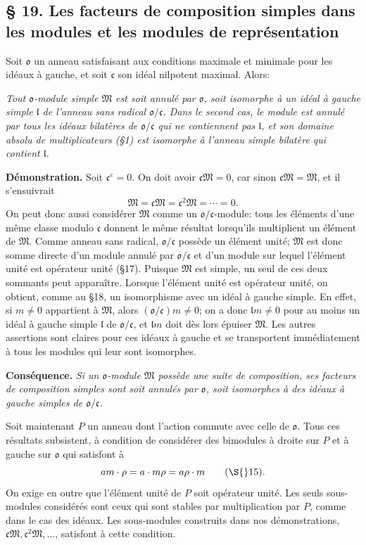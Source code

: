 
\providecommand{\mo}{\mathfrak{o}}
\providecommand{\mc}{\mathfrak{c}}
\providecommand{\mM}{\mathfrak{M}}
\providecommand{\ml}{\mathfrak{l}}

\subsection*{\S{} 19. Les facteurs de composition simples dans les modules et les modules de représentation}
Soit $\mo$ un anneau satisfaisant aux conditions maximale et minimale pour les idéaux à gauche, et soit $\mc$ son idéal nilpotent maximal. Alors:

\emph{Tout $\mo$-module simple $\mM$ est soit annulé par $\mo$, soit isomorphe à un idéal à gauche simple $\ml$ de l'anneau sans radical $\mo/\mc$. Dans le second cas, le module est annulé par tous les idéaux bilatères de $\mo/\mc$ qui ne contiennent pas $\ml$, et son domaine absolu de multiplicateurs (\S{}1) est isomorphe à l'anneau simple bilatère qui contient $\ml$.}

\textbf{Démonstration.} Soit $\mc^e=0$. On doit avoir $\mc\mM=0$, car sinon $\mc\mM=\mM$, et il s'ensuivrait
\[
        \mM=\mc\mM=\mc^2\mM=\cdots=0.
\]
On peut donc aussi considérer $\mM$ comme un $\mo/\mc$-module: tous les éléments d'une même classe modulo $\mc$ donnent le même résultat lorsqu'ils multiplient un élément de $\mM$. Comme anneau sans radical, $\mo/\mc$ possède un élément unité; $\mM$ est donc somme directe d'un module annulé par $\mo/\mc$ et d'un module sur lequel l'élément unité est opérateur unité (\S{}17). Puisque $\mM$ est simple, un seul de ces deux sommants peut apparaître. Lorsque l'élément unité est opérateur unité, on obtient, comme au \S{}18, un isomorphisme avec un idéal à gauche simple. En effet, si $m\ne0$ appartient à $\mM$, alors $(\mo/\mc)m\ne0$; on a donc $\ml m\ne0$ pour au moins un idéal à gauche simple $\ml$ de $\mo/\mc$, et $\ml m$ doit dès lors épuiser $\mM$. Les autres assertions sont claires pour ces idéaux à gauche et se transportent immédiatement à tous les modules qui leur sont isomorphes.

\textbf{Conséquence.} \emph{Si un $\mo$-module $\mM$ possède une suite de composition, ses facteurs de composition simples sont soit annulés par $\mo$, soit isomorphes à des idéaux à gauche simples de $\mo/\mc$.}

Soit maintenant $P$ un anneau dont l'action commute avec celle de $\mo$. Tous ces résultats subsistent, à condition de considérer des bimodules à droite sur $P$ et à gauche sur $\mo$ qui satisfont à
\[
        am\cdot\rho=a\cdot m\rho=a\rho\cdot m\qquad(\S{}15).
\]
On exige en outre que l'élément unité de $P$ soit opérateur unité. Les seuls sous-modules considérés sont ceux qui sont stables par multiplication par $P$, comme dans le cas des idéaux. Les sous-modules construits dans nos démonstrations, $\mc\mM,\mc^2\mM,\ldots$, satisfont à cette condition.

